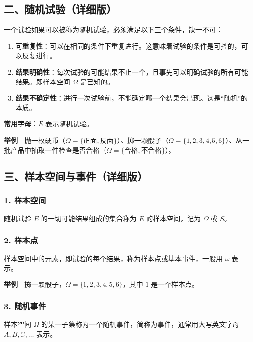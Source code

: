 \documentclass[12pt,a4paper]{ctexart}
\begin{document}
\subsection{二、随机试验（详细版）}

一个试验如果可以被称为随机试验，必须满足以下三个条件，缺一不可：

\begin{enumerate}[noitemsep]
    \item \textbf{可重复性}：可以在相同的条件下重复进行。这意味着试验的条件是可控的，可以反复进行。
    \item \textbf{结果明确性}：每次试验的可能结果不止一个，且事先可以明确试验的所有可能结果。即样本空间 $\Omega$ 是已知的。
    \item \textbf{结果不确定性}：进行一次试验前，不能确定哪一个结果会出现。这是“随机”的本质。
\end{enumerate}

\textbf{常用字母}：$E$ 表示随机试验。

\textbf{举例}：抛一枚硬币（$\Omega = \{正面, 反面\}$）、掷一颗骰子（$\Omega = \{1,2,3,4,5,6\}$）、从一批产品中抽取一件检查是否合格（$\Omega = \{合格, 不合格\}$）。

\subsection{三、样本空间与事件（详细版）}

\subsubsection{1. 样本空间}
随机试验 $E$ 的一切可能结果组成的集合称为 $E$ 的样本空间，记为 $\Omega$ 或 $S$。

\subsubsection{2. 样本点}
样本空间中的元素，即试验的每个结果，称为样本点或基本事件，一般用 $\omega$ 表示。

\textbf{举例}：掷一颗骰子，$\Omega = \{1,2,3,4,5,6\}$，其中 $1$ 是一个样本点。

\subsubsection{3. 随机事件}
样本空间 $\Omega$ 的某一子集称为一个随机事件，简称为事件，通常用大写英文字母 $A, B, C, \dots$ 表示。
\end{document}
